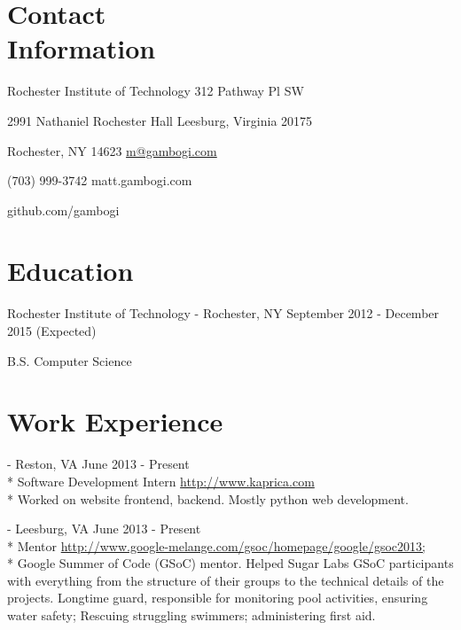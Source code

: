 \documentclass[letter,margin,line]{resume}
\newcommand{\rurl}[1]{\hfill {\footnotesize \url{#1}}}
\newcommand{\rdate}[1]{\hfill {\small #1}}
\renewcommand{\employer}[5]{\item[#1] - #2 \rdate{#3} \\* #4 \rurl{#5} \\*}
\begin{document}
\begin{resume}
\section{\mysidestyle Contact \\ Information} \vspace{2mm}
	\begin{asparablank}
		\item Rochester Institute of Technology \hfill 312 Pathway Pl SW
		\item 2991 Nathaniel Rochester Hall \hfill Leesburg, Virginia 20175
		\item Rochester, NY 14623 \hfill
		\href{mailto:m@gambogi.com}{m@gambogi.com}
		\item (703) 999-3742 \hfill {matt.gambogi.com}
		\item \hfill github.com/gambogi
	\end{asparablank}

\section{\mysidestyle Education}
	\begin{compactdesc}
		\item[Rochester Institute of Technology] - Rochester, NY \rdate{September 2012 - December 2015 (Expected)}
		\item B.S. Computer Science
	\end{compactdesc}

\section{\mysidestyle Work Experience}
	\begin{asparadesc}
		\employer{Kaprica Security}{Reston, VA}{June 2013 - Present}{Software Development Intern}{http://www.kaprica.com}
        	\small
		Worked on website frontend, backend. Mostly python web development. 
		\employer{Google Summer of Code, Sugar Labs}{Leesburg, VA}{June 2013 - Present}{Mentor}{http://www.google-melange.com/gsoc/homepage/google/gsoc2013;}
        	Google Summer of Code (GSoC) mentor. Helped Sugar Labs GSoC participants with everything from the structure of their groups to the technical details of the projects.
        	\small
        Longtime guard, responsible for monitoring pool activities, ensuring water safety; Rescuing struggling swimmers; administering first aid.
		\normalsize
		\\
		

\end{asparadesc}
\end{resume}
\end{document}
